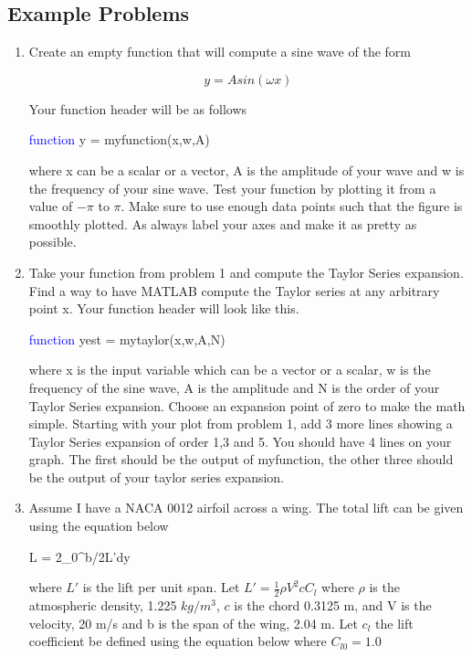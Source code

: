 \subsection{Example Problems}

\begin{enumerate}

\item Create an empty function that will compute a sine wave of the form

  \begin{equation}
    y = Asin(\omega x)
  \end{equation}
  
  Your function header will be as follows

  \textcolor{blue}{function} y = myfunction(x,w,A)

  where x can be a scalar or a vector, A is the amplitude of your wave
  and w is the frequency of your sine wave. Test your function by
  plotting it from a value of $-\pi$ to $\pi$. Make sure to use enough data
  points such that the figure is smoothly plotted. As always label
  your axes and make it as pretty as possible.

\item Take your function from problem 1 and compute the Taylor Series
  expansion. Find a way to have MATLAB compute the Taylor series at
  any arbitrary point x. Your function header will look like this.

  \textcolor{blue}{function} yest = mytaylor(x,w,A,N)

  where x is the input variable which can be a vector or a scalar, w
  is the frequency of the sine wave, A is the amplitude and N is the 
  order of your Taylor Series expansion. Choose an expansion point of
  zero to make the math simple. Starting with your plot from
  problem 1, add 3 more lines showing a Taylor Series expansion of
  order 1,3 and 5. You should have 4 lines on your graph. The first
  should be the output of myfunction, the other three should be the
  output of your taylor series expansion.

\item Assume I have a NACA 0012 airfoil across a wing. The total lift
  can be given using the equation below

  \beq
  L = 2\int\limits_0^{b/2}L'dy
  \eeq

  where $L'$ is the lift per unit span. Let $L' = \frac{1}{2}\rho V^2 c C_l$
  where $\rho$ is the atmospheric density, 1.225 $kg/m^3$, $c$ is the
  chord 0.3125 m, and V is the velocity, 20 m/s and b is the span of
  the wing, 2.04 m. Let $c_l$ the lift
  coefficient be defined using the equation below where $C_{l0} = 1.0$


\end{enumerate}
